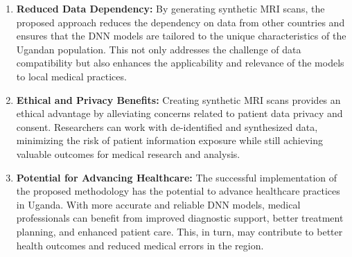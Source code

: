 \begin{enumerate}
    \item \textbf{Reduced Data Dependency:} By generating synthetic MRI scans, the proposed approach reduces the dependency on data from other countries and ensures that the DNN models are tailored to the unique characteristics of the Ugandan population. This not only addresses the challenge of data compatibility but also enhances the applicability and relevance of the models to local medical practices.

    \item \textbf{Ethical and Privacy Benefits:} Creating synthetic MRI scans provides an ethical advantage by alleviating concerns related to patient data privacy and consent. Researchers can work with de-identified and synthesized data, minimizing the risk of patient information exposure while still achieving valuable outcomes for medical research and analysis.

    \item \textbf{Potential for Advancing Healthcare:} The successful implementation of the proposed methodology has the potential to advance healthcare practices in Uganda. With more accurate and reliable DNN models, medical professionals can benefit from improved diagnostic support, better treatment planning, and enhanced patient care. This, in turn, may contribute to better health outcomes and reduced medical errors in the region.
\end{enumerate}
